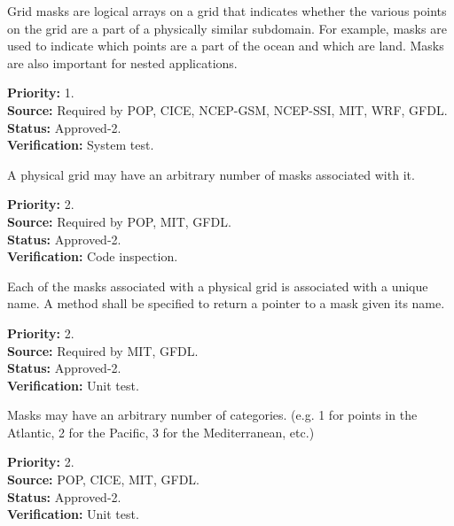 
Grid masks are logical arrays on a grid that indicates whether the various
points on the grid are a part of a physically similar subdomain. For example,
masks are used to indicate which points are a part of the ocean and which are
land.  Masks are also important for nested applications.

\begin{reqlist}
{\bf Priority:} 1. \\
{\bf Source:} Required by POP, CICE, NCEP-GSM, NCEP-SSI, MIT, WRF, GFDL. \\
{\bf Status:} Approved-2. \\
{\bf Verification:} System test.
\end{reqlist}

A physical grid may have an arbitrary number of masks associated with it.
\begin{reqlist}
{\bf Priority:} 2. \\
{\bf Source:} Required by POP, MIT, GFDL. \\
{\bf Status:} Approved-2. \\
{\bf Verification:} Code inspection.
\end{reqlist}

Each of the masks associated with a physical grid is associated with a
unique name.  A method shall be specified to return a pointer to a mask given
its name.
\begin{reqlist}
{\bf Priority:} 2. \\
{\bf Source:} Required by MIT, GFDL. \\
{\bf Status:} Approved-2. \\
{\bf Verification:} Unit test.
\end{reqlist}

Masks may have an arbitrary number of categories. (e.g. 1 for points in the
Atlantic, 2 for the Pacific, 3 for the Mediterranean, etc.)
\begin{reqlist}
{\bf Priority:} 2. \\
{\bf Source:} POP, CICE, MIT, GFDL. \\
{\bf Status:} Approved-2. \\
{\bf Verification:} Unit test.
\end{reqlist}

